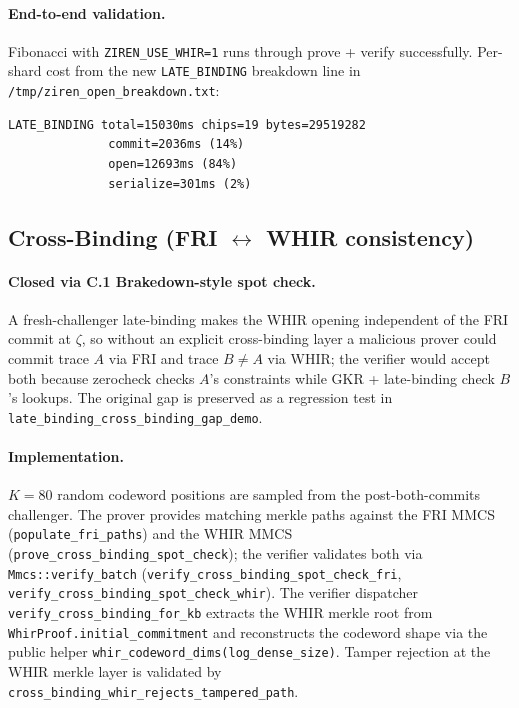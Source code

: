 \paragraph{End-to-end validation.}
Fibonacci with \texttt{ZIREN\_USE\_WHIR=1} runs through prove + verify
successfully.  Per-shard cost from the new \texttt{LATE\_BINDING}
breakdown line in \texttt{/tmp/ziren\_open\_breakdown.txt}:
\begin{verbatim}
LATE_BINDING total=15030ms chips=19 bytes=29519282
              commit=2036ms (14%)
              open=12693ms (84%)
              serialize=301ms (2%)
\end{verbatim}

\subsection{Cross-Binding (FRI $\leftrightarrow$ WHIR consistency)}

\paragraph{Closed via C.1 Brakedown-style spot check.}
A fresh-challenger late-binding makes the WHIR opening independent
of the FRI commit at $\zeta$, so without an explicit cross-binding
layer a malicious prover could commit trace $A$ via FRI and trace
$B \neq A$ via WHIR; the verifier would accept both because
zerocheck checks $A$'s constraints while GKR + late-binding check
$B$'s lookups.  The original gap is preserved as a regression test
in \texttt{late\_binding\_cross\_binding\_gap\_demo}.

\paragraph{Implementation.}  $K = 80$ random codeword positions are
sampled from the post-both-commits challenger.  The prover provides
matching merkle paths against the FRI MMCS
(\texttt{populate\_fri\_paths}) and the WHIR MMCS
(\texttt{prove\_cross\_binding\_spot\_check}); the verifier
validates both via \texttt{Mmcs::verify\_batch}
(\texttt{verify\_cross\_binding\_spot\_check\_fri},
\texttt{verify\_cross\_binding\_spot\_check\_whir}).  The verifier
dispatcher \texttt{verify\_cross\_binding\_for\_kb} extracts the
WHIR merkle root from
\texttt{WhirProof.initial\_commitment} and reconstructs the
codeword shape via the public helper
\texttt{whir\_codeword\_dims(log\_dense\_size)}.  Tamper rejection
at the WHIR merkle layer is validated by
\texttt{cross\_binding\_whir\_rejects\_tampered\_path}.

